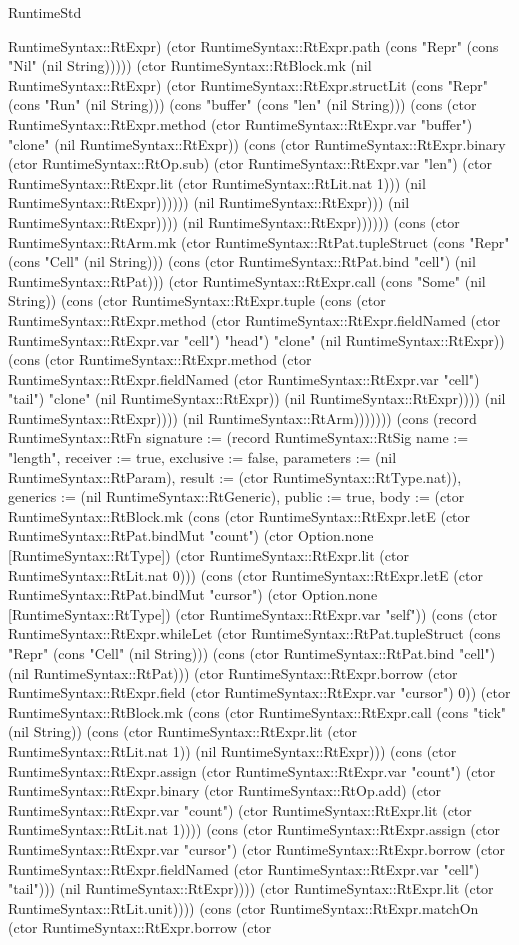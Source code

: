 \begin{lexlean}{RuntimeStd}
\begin{semanticmodule}
{RuntimeSyntax::RtExpr) (ctor RuntimeSyntax::RtExpr.path (cons "Repr" (cons "Nil" (nil String))))) (ctor RuntimeSyntax::RtBlock.mk (nil RuntimeSyntax::RtExpr) (ctor RuntimeSyntax::RtExpr.structLit (cons "Repr" (cons "Run" (nil String))) (cons "buffer" (cons "len" (nil String))) (cons (ctor RuntimeSyntax::RtExpr.method (ctor RuntimeSyntax::RtExpr.var "buffer") "clone" (nil RuntimeSyntax::RtExpr)) (cons (ctor RuntimeSyntax::RtExpr.binary (ctor RuntimeSyntax::RtOp.sub) (ctor RuntimeSyntax::RtExpr.var "len") (ctor RuntimeSyntax::RtExpr.lit (ctor RuntimeSyntax::RtLit.nat 1))) (nil RuntimeSyntax::RtExpr)))))) (nil RuntimeSyntax::RtExpr))) (nil RuntimeSyntax::RtExpr)))) (nil RuntimeSyntax::RtExpr)))))) (cons (ctor RuntimeSyntax::RtArm.mk (ctor RuntimeSyntax::RtPat.tupleStruct (cons "Repr" (cons "Cell" (nil String))) (cons (ctor RuntimeSyntax::RtPat.bind "cell") (nil RuntimeSyntax::RtPat))) (ctor RuntimeSyntax::RtExpr.call (cons "Some" (nil String)) (cons (ctor RuntimeSyntax::RtExpr.tuple (cons (ctor RuntimeSyntax::RtExpr.method (ctor RuntimeSyntax::RtExpr.fieldNamed (ctor RuntimeSyntax::RtExpr.var "cell") "head") "clone" (nil RuntimeSyntax::RtExpr)) (cons (ctor RuntimeSyntax::RtExpr.method (ctor RuntimeSyntax::RtExpr.fieldNamed (ctor RuntimeSyntax::RtExpr.var "cell") "tail") "clone" (nil RuntimeSyntax::RtExpr)) (nil RuntimeSyntax::RtExpr)))) (nil RuntimeSyntax::RtExpr)))) (nil RuntimeSyntax::RtArm))))))}) (cons (record RuntimeSyntax::RtFn {signature := (record RuntimeSyntax::RtSig {name := "length", receiver := true, exclusive := false, parameters := (nil RuntimeSyntax::RtParam), result := (ctor RuntimeSyntax::RtType.nat)}), generics := (nil RuntimeSyntax::RtGeneric), public := true, body := (ctor RuntimeSyntax::RtBlock.mk (cons (ctor RuntimeSyntax::RtExpr.letE (ctor RuntimeSyntax::RtPat.bindMut "count") (ctor Option.none [RuntimeSyntax::RtType]) (ctor RuntimeSyntax::RtExpr.lit (ctor RuntimeSyntax::RtLit.nat 0))) (cons (ctor RuntimeSyntax::RtExpr.letE (ctor RuntimeSyntax::RtPat.bindMut "cursor") (ctor Option.none [RuntimeSyntax::RtType]) (ctor RuntimeSyntax::RtExpr.var "self")) (cons (ctor RuntimeSyntax::RtExpr.whileLet (ctor RuntimeSyntax::RtPat.tupleStruct (cons "Repr" (cons "Cell" (nil String))) (cons (ctor RuntimeSyntax::RtPat.bind "cell") (nil RuntimeSyntax::RtPat))) (ctor RuntimeSyntax::RtExpr.borrow (ctor RuntimeSyntax::RtExpr.field (ctor RuntimeSyntax::RtExpr.var "cursor") 0)) (ctor RuntimeSyntax::RtBlock.mk (cons (ctor RuntimeSyntax::RtExpr.call (cons "tick" (nil String)) (cons (ctor RuntimeSyntax::RtExpr.lit (ctor RuntimeSyntax::RtLit.nat 1)) (nil RuntimeSyntax::RtExpr))) (cons (ctor RuntimeSyntax::RtExpr.assign (ctor RuntimeSyntax::RtExpr.var "count") (ctor RuntimeSyntax::RtExpr.binary (ctor RuntimeSyntax::RtOp.add) (ctor RuntimeSyntax::RtExpr.var "count") (ctor RuntimeSyntax::RtExpr.lit (ctor RuntimeSyntax::RtLit.nat 1)))) (cons (ctor RuntimeSyntax::RtExpr.assign (ctor RuntimeSyntax::RtExpr.var "cursor") (ctor RuntimeSyntax::RtExpr.borrow (ctor RuntimeSyntax::RtExpr.fieldNamed (ctor RuntimeSyntax::RtExpr.var "cell") "tail"))) (nil RuntimeSyntax::RtExpr)))) (ctor RuntimeSyntax::RtExpr.lit (ctor RuntimeSyntax::RtLit.unit)))) (cons (ctor RuntimeSyntax::RtExpr.matchOn (ctor RuntimeSyntax::RtExpr.borrow (ctor }
\end{semanticmodule}
\end{lexlean}
